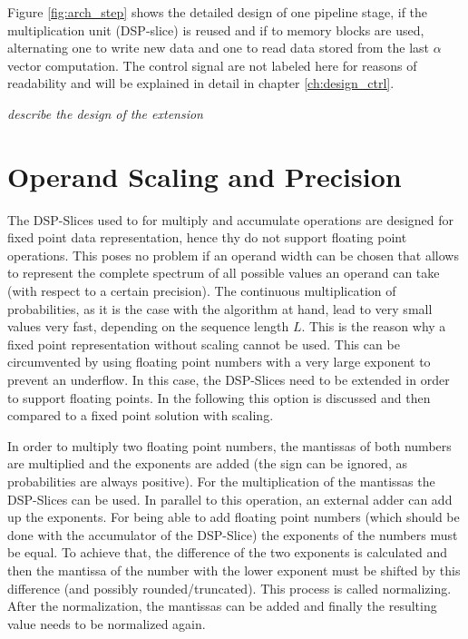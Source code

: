 \documentclass[mscthesis]{usiinfthesis}
\begin{document}
Figure \ref{fig:arch_step} shows the detailed design of one pipeline stage, if
the multiplication unit (DSP-slice) is reused and if to memory blocks are used,
alternating one to write new data and one to read data stored from the last
$\alpha$ vector computation. The control signal are not labeled here for reasons
of readability and will be explained in detail in chapter \ref{ch:design_ctrl}.

\emph{\color{red}describe the design of the extension}

\section{Operand Scaling and Precision}

The DSP-Slices used to for multiply and accumulate operations are designed for
fixed point data representation, hence thy do not support floating point
operations. This poses no problem if an operand width can be chosen that allows
to represent the complete spectrum of all possible values an operand can take
(with respect to a certain precision). The continuous multiplication of
probabilities, as it is the case with the algorithm at hand, lead to very small
values very fast, depending on the sequence length $L$. This is the reason why
a fixed point representation without scaling cannot be used. This can be
circumvented by using floating point numbers with a very large exponent to
prevent an underflow. In this case, the DSP-Slices need to be extended in order
to support floating points. In the following this option is discussed and then
compared to a fixed point solution with scaling.

In order to multiply two floating point numbers, the mantissas of both numbers
are multiplied and the exponents are added (the sign can be ignored, as
probabilities are always positive). For the multiplication of the mantissas the
DSP-Slices can be used. In parallel to this operation, an external adder can
add up the exponents. For being able to add floating point numbers (which
should be done with the accumulator of the DSP-Slice) the exponents of the
numbers must be equal. To achieve that, the difference of the two exponents is
calculated and then the mantissa of the number with the lower exponent must be
shifted by this difference (and possibly rounded/truncated). This process is
called normalizing. After the normalization, the mantissas can be added and
finally the resulting value needs to be normalized again.
\end{document}
